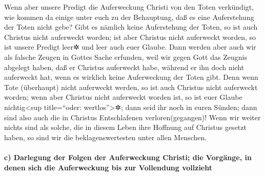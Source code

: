  Wenn aber unsere Predigt die Auferweckung Christi von
den Toten verkündigt, wie kommen da einige unter euch zu der Behauptung,
daß es eine Auferstehung der Toten nicht gebe?  Gibt es
nämlich keine Auferstehung der Toten, so ist auch Christus nicht
auferweckt worden;  ist aber Christus nicht auferweckt
worden, so ist unsere Predigt leer✲ und leer auch euer Glaube.
 Dann werden aber auch wir als falsche Zeugen in Gottes
Sache erfunden, weil wir gegen Gott das Zeugnis abgelegt haben, daß er
Christus auferweckt habe, während er ihn doch nicht auferweckt hat, wenn
es wirklich keine Auferweckung der Toten gibt.  Denn wenn
Tote (überhaupt) nicht auferweckt werden, so ist auch Christus nicht
auferweckt worden;  wenn aber Christus nicht auferweckt
worden ist, so ist euer Glaube nichtig\textless sup title=``oder:
wertlos''\textgreater✲; dann seid ihr noch in euren Sünden;
 dann sind also auch die in Christus Entschlafenen
verloren(gegangen)!  Wenn wir weiter nichts sind als
solche, die in diesem Leben ihre Hoffnung auf Christus gesetzt haben, so
sind wir die beklagenswertesten unter allen Menschen.

\hypertarget{c-darlegung-der-folgen-der-auferweckung-christi-die-vorguxe4nge-in-denen-sich-die-auferweckung-bis-zur-vollendung-vollzieht}{%
\paragraph{c) Darlegung der Folgen der Auferweckung Christi; die
Vorgänge, in denen sich die Auferweckung bis zur Vollendung
vollzieht}\label{c-darlegung-der-folgen-der-auferweckung-christi-die-vorguxe4nge-in-denen-sich-die-auferweckung-bis-zur-vollendung-vollzieht}}

